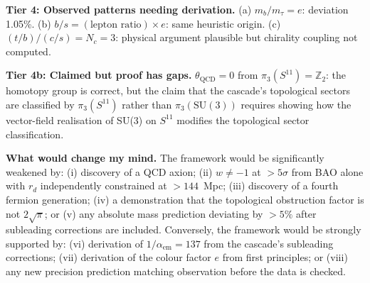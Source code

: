 \documentclass[12pt,a4paper]{article}
\begin{document}
\textbf{Tier 4: Observed patterns needing derivation.} (a) $m_b/m_\tau = e$: deviation 1.05\%. (b) $b/s = (\text{lepton ratio}) \times e$: same heuristic origin. (c) $(t/b)/(c/s) = N_c = 3$: physical argument plausible but chirality coupling not computed.

\textbf{Tier 4b: Claimed but proof has gaps.} $\theta_{\text{QCD}} = 0$ from $\pi_3(S^{11}) = \mathbb{Z}_2$: the homotopy group is correct, but the claim that the cascade's topological sectors are classified by $\pi_3(S^{11})$ rather than $\pi_3(\text{SU}(3))$ requires showing how the vector-field realisation of SU(3) on $S^{11}$ modifies the topological sector classification.

\textbf{What would change my mind.} The framework would be significantly weakened by: (i) discovery of a QCD axion; (ii) $w \neq -1$ at $> 5\sigma$ from BAO alone with $r_d$ independently constrained at $> 144$~Mpc; (iii) discovery of a fourth fermion generation; (iv) a demonstration that the topological obstruction factor is not $2\sqrt{\pi}$; or (v) any absolute mass prediction deviating by $> 5\%$ after subleading corrections are included. Conversely, the framework would be strongly supported by: (vi) derivation of $1/\alpha_{\text{em}} = 137$ from the cascade's subleading corrections; (vii) derivation of the colour factor $e$ from first principles; or (viii) any new precision prediction matching observation before the data is checked.
\end{document}
